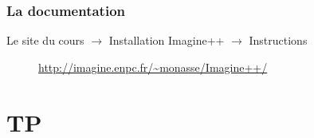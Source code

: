 \begin{frame}
\frametitle{La documentation}

Le site du cours $\rightarrow$ Installation Imagine++ $\rightarrow$ Instructions
\begin{figure}
\centering
\url{http://imagine.enpc.fr/~monasse/Imagine++/}


\end{figure}
\end{frame}

\section{TP}

